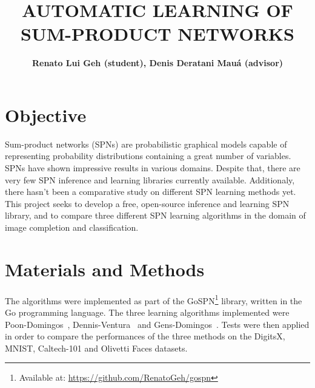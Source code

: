 \documentclass[10pt,a4paper]{article}
\title{AUTOMATIC LEARNING OF SUM-PRODUCT NETWORKS}
\author{\textbf{Renato Lui Geh (student), Denis Deratani Mauá (advisor)}}
\affil{Institute of Mathematics and Statistics, University of São Paulo}
\affil{\fontsize{10pt}{12}\selectfont\{renatolg,ddm\}@ime.usp.br}
\date{}
\begin{document}
\maketitle

\begin{multicols*}{2}

\section*{Objective}

Sum-product networks (SPNs) are probabilistic graphical models capable of representing probability
distributions containing a great number of variables. SPNs have shown impressive results in various
domains. Despite that, there are very few SPN inference and learning libraries currently available.
Additionaly, there hasn't been a comparative study on different SPN learning methods yet. This
project seeks to develop a free, open-source inference and learning SPN library, and to compare
three different SPN learning algorithms in the domain of image completion and classification.


\section*{Materials and Methods}

The algorithms were implemented as part of the GoSPN\footnote{Available at:
  \url{https://github.com/RenatoGeh/gospn}} library, written in the Go programming language. The
three learning algorithms implemented were Poon-Domingos~\cite{poon-domingos},
Dennis-Ventura~\cite{clustering} and Gens-Domingos~\cite{gens-domingos}. Tests were then applied in
order to compare the performances of the three methods on the DigitsX, MNIST, Caltech-101 and
Olivetti Faces datasets.



\end{multicols*}
\end{document}
